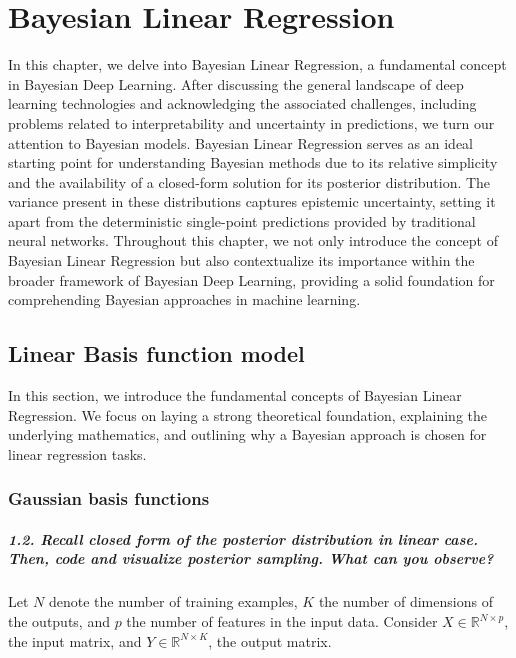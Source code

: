\graphicspath{{figs/3a}}
\chapter{Bayesian Linear Regression}

In this chapter, we delve into Bayesian Linear Regression, a fundamental concept in Bayesian Deep Learning. After discussing the general landscape of deep learning technologies and acknowledging the associated challenges, including problems related to interpretability and uncertainty in predictions, we turn our attention to Bayesian models. Bayesian Linear Regression serves as an ideal starting point for understanding Bayesian methods due to its relative simplicity and the availability of a closed-form solution for its posterior distribution. The variance present in these distributions captures epistemic uncertainty, setting it apart from the deterministic single-point predictions provided by traditional neural networks. Throughout this chapter, we not only introduce the concept of Bayesian Linear Regression but also contextualize its importance within the broader framework of Bayesian Deep Learning, providing a solid foundation for comprehending Bayesian approaches in machine learning.

\section{Linear Basis function model}

In this section, we introduce the fundamental concepts of Bayesian Linear Regression. We focus on laying a strong theoretical foundation, explaining the underlying mathematics, and outlining why a Bayesian approach is chosen for linear regression tasks.

\subsection{Gaussian basis functions}
\paragraph*{1.2. Recall closed form of the posterior distribution in linear case. Then, code and visualize posterior sampling. What can you observe?}

Let $N$ denote the number of training examples, $K$ the number of dimensions of the outputs, and $p$ the number of features in the input data. Consider $X \in \mathbb{R}^{N \times p}$, the input matrix, and $Y \in \mathbb{R}^{N \times K}$, the output matrix. 

